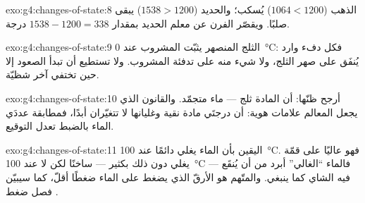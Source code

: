 \begin{solution}{exo:g4:changes-of-state:8}
الذهب ($1064 < 1200$) يُسكب؛ والحديد ($1538 > 1200$) يبقى صلبًا.
ويقصّر الفرن عن معلم الحديد بمقدار $1538 - 1200 = 338$ درجة.
\end{solution}

\begin{solution}{exo:g4:changes-of-state:9}
الثلج المنصهر يثبّت المشروب عند \qty{0}{\celsius}: فكل دفء وارد
يُنفَق على صهر الثلج، ولا شيء منه على تدفئة المشروب. ولا تستطيع
 أن تبدأ الصعود إلا حين تختفي آخر شظيّة.
\end{solution}

\begin{solution}{exo:g4:changes-of-state:10}
أرجح ظنّها: أن المادة ثلج --- ماء متجمّد. والقانون الذي يجعل
المعالم علامات هوية: أن درجتَي  مادة نقية وغليانها لا
تتغيّران أبدًا، فمطابقة عددَي الماء بالضبط تعدل التوقيع.
\end{solution}

\begin{solution}{exo:g4:changes-of-state:11}
اليقين بأن الماء يغلي دائمًا عند \qty{100}{\celsius}. فهو عاليًا
على قمّة يغلي دون ذلك بكثير --- ساخنًا لكن لا عند
\qty{100}{\celsius} --- فالماء ``الغالي'' أبرد من أن يُنقَع فيه
الشاي كما ينبغي. والمتّهم هو  الأرقّ الذي يضغط على الماء
ضغطًا أقلّ، كما سيبيّن فصل ضغط .
\end{solution}
